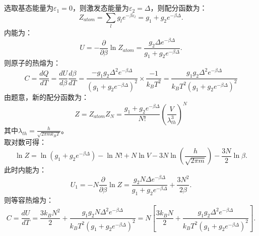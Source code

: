 \documentclass[a4paper,12pt]{article}
\begin{document}
\section{}
选取基态能量为$\varepsilon_1 = 0$，则激发态能量为$\varepsilon_2 = \Delta$，则配分函数为：
\begin{equation}\nonumber
	Z_{atom} = \sum_l g_l e^{-\beta \varepsilon_l} = g_1 + g_2 e^{-\beta \Delta}.
\end{equation}
内能为：
\begin{equation}\nonumber
	U = - \frac{\partial }{\partial \beta} \ln Z_{atom} = \frac{g_2\Delta e^{-\beta\Delta}}{g_1 + g_2e^{-\beta\Delta}}.
\end{equation}
则原子的热熔为：
\begin{equation}\nonumber
	C = \frac{dQ}{dT} = \frac{dU}{d\beta}\frac{d\beta}{dT} = \frac{-g_1g_2\Delta^2e^{-\beta\Delta}}{\left( g_1 + g_2e^{-\beta\Delta} \right)^2} \times \frac{-1}{k_BT^2} = \frac{g_1g_2\Delta^2e^{-\beta\Delta}}{k_BT^2\left( g_1 + g_2e^{-\beta\Delta} \right)^2}
\end{equation}
由题意，新的配分函数为：
\begin{equation}\nonumber
	Z = Z_{atom}Z_N = \frac{g_1 + g_2 e^{-\beta \Delta}}{N!}\left( \frac{V}{\lambda_{th}^3} \right)^N
\end{equation}
其中$\lambda_{th} = \frac{h}{\sqrt{2\pi m k_BT}}$。 \\
取对数可得：
\begin{equation}\nonumber
	\ln Z = \ln\left( g_1 + g_2 e^{-\beta \Delta} \right) - \ln N! + N \ln V - 3N \ln\left( \frac{h}{\sqrt{2\pi m}} \right) - \frac{3N}{2}\ln \beta.
\end{equation}
此时内能为：
\begin{equation}\nonumber
	U_1 = - N\frac{\partial }{\partial \beta} \ln Z = \frac{g_2N\Delta e^{-\beta\Delta}}{g_1 + g_2e^{-\beta\Delta}} + \frac{3N^2}{2\beta}.
\end{equation}
则等容热熔为：
\begin{equation}\nonumber
	C = \frac{dU}{dT} = \frac{3k_BN^2}{2} + \frac{g_1g_2N\Delta^2e^{-\beta\Delta}}{k_BT^2\left( g_1 + g_2e^{-\beta\Delta} \right)^2} = N\left[ \frac{3k_BN}{2} + \frac{g_1g_2\Delta^2e^{-\beta\Delta}}{k_BT^2\left( g_1 + g_2e^{-\beta\Delta} \right)^2} \right].
\end{equation}
\end{document}
